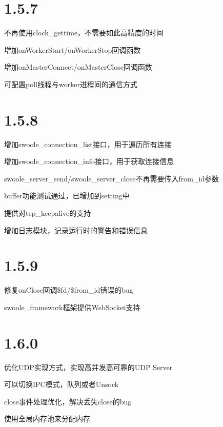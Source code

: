\section{1.5.7}


\begin{compactitem}
\item 不再使用clock\_gettime，不需要如此高精度的时间
\item 增加onWorkerStart/onWorkerStop回调函数
\item 增加onMasterConnect/onMasterClose回调函数
\item 可配置poll线程与worker进程间的通信方式
\end{compactitem}


\section{1.5.8}

\begin{compactitem}
\item 增加swoole\_connection\_list接口，用于遍历所有连接
\item 增加swoole\_connection\_info接口，用于获取连接信息
\item swoole\_server\_send/swoole\_server\_close不再需要传入from\_id参数
\item buffer功能测试通过，已增加到setting中
\item 提供对tcp\_keepalive的支持
\item 增加日志模块，记录运行时的警告和错误信息
\end{compactitem}

\section{1.5.9}


\begin{compactitem}
\item 修复onClose回调\$fd/\$from\_id错误的bug
\item swoole\_framework框架提供WebSocket支持
\end{compactitem}

\section{1.6.0}

\begin{compactitem}
\item 优化UDP实现方式，实现高并发高可靠的UDP Server
\item 可以切换IPC模式，队列或者Unsock
\item close事件处理优化，解决丢失close的bug
\item 使用全局内存池来分配内存
\end{compactitem}


